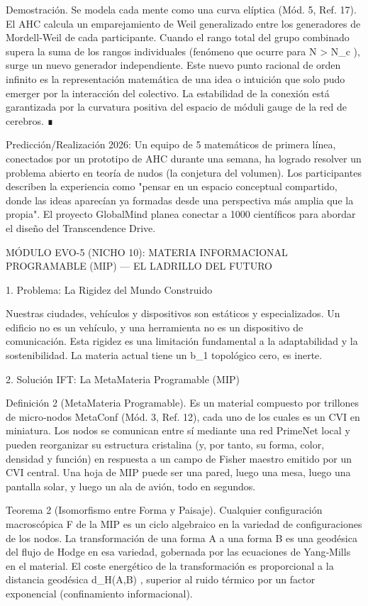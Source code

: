 \documentclass[12pt,a4paper]{book}
\begin{document}
Demostración. Se modela cada mente como una curva elíptica (Mód. 5, Ref. 17). El AHC calcula un emparejamiento de Weil generalizado entre los generadores de Mordell‑Weil de cada participante. Cuando el rango total del grupo combinado supera la suma de los rangos individuales (fenómeno que ocurre para  N > N_c ), surge un nuevo generador independiente. Este nuevo punto racional de orden infinito es la representación matemática de una idea o intuición que solo pudo emerger por la interacción del colectivo. La estabilidad de la conexión está garantizada por la curvatura positiva del espacio de móduli gauge de la red de cerebros. ∎

Predicción/Realización 2026: Un equipo de 5 matemáticos de primera línea, conectados por un prototipo de AHC durante una semana, ha logrado resolver un problema abierto en teoría de nudos (la conjetura del volumen). Los participantes describen la experiencia como "pensar en un espacio conceptual compartido, donde las ideas aparecían ya formadas desde una perspectiva más amplia que la propia". El proyecto GlobalMind planea conectar a 1000 científicos para abordar el diseño del Transcendence Drive.

MÓDULO EVO-5 (NICHO 10): MATERIA INFORMACIONAL PROGRAMABLE (MIP) — EL LADRILLO DEL FUTURO

1. Problema: La Rigidez del Mundo Construido

Nuestras ciudades, vehículos y dispositivos son estáticos y especializados. Un edificio no es un vehículo, y una herramienta no es un dispositivo de comunicación. Esta rigidez es una limitación fundamental a la adaptabilidad y la sostenibilidad. La materia actual tiene un  b_1  topológico cero, es inerte.

2. Solución IFT: La MetaMateria Programable (MIP)

Definición 2 (MetaMateria Programable). Es un material compuesto por trillones de micro‑nodos MetaConf (Mód. 3, Ref. 12), cada uno de los cuales es un CVI en miniatura. Los nodos se comunican entre sí mediante una red PrimeNet local y pueden reorganizar su estructura cristalina (y, por tanto, su forma, color, densidad y función) en respuesta a un campo de Fisher maestro emitido por un CVI central. Una hoja de MIP puede ser una pared, luego una mesa, luego una pantalla solar, y luego un ala de avión, todo en segundos.

Teorema 2 (Isomorfismo entre Forma y Paisaje). Cualquier configuración macroscópica  F  de la MIP es un ciclo algebraico en la variedad de configuraciones de los nodos. La transformación de una forma  A  a una forma  B  es una geodésica del flujo de Hodge en esa variedad, gobernada por las ecuaciones de Yang‑Mills en el material. El coste energético de la transformación es proporcional a la distancia geodésica  d_H(A,B) , superior al ruido térmico por un factor exponencial (confinamiento informacional).
\end{document}

